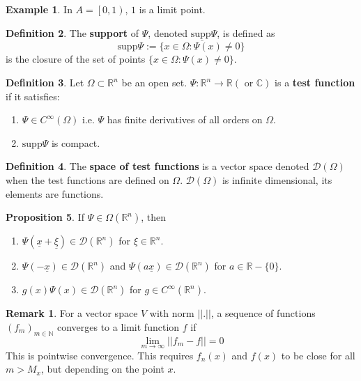 \documentclass[12pt,a4paper]{article}
\theoremstyle{definition}
\newtheorem{definition}{Definition}[subsection]
\newtheorem{proposition}[definition]{Proposition}
\newtheorem{example}[definition]{Example}
\newtheorem*{remark}{Remark}
\begin{document}
\begin{example}
	In $A = \left[0, 1 \right)$, $1$ is a limit point.
\end{example}

\begin{definition}
	The \textbf{support} of $\Psi$, denoted $\text{supp} \Psi$, is defined as
	\[
		\text{supp} \Psi := \overline{\{ x \in \Omega: \Psi(x) \ne 0 \}}
	\]
	is the closure of the set of points $\{ x \in \Omega: \Psi(x) \ne 0 \}$.
\end{definition}

\begin{definition}
	Let $\Omega \subset \mathbb{R}^n$ be an open set. $\Psi: \mathbb{R}^n \rightarrow \mathbb{R} (\text{ or } \mathbb{C})$ is a \textbf{test function} if it satisfies:
	\begin{enumerate}
		\item $\Psi \in C^{\infty} (\Omega)$ i.e. $\Psi$ has finite derivatives of all orders on $\Omega$.
		\item $\text{supp} \Psi$ is compact.
	\end{enumerate}
\end{definition}

\begin{definition}
	The \textbf{space of test functions} is a vector space denoted $\mathcal{D}(\Omega)$ when the test functions are defined on $\Omega$. $\mathcal{D}(\Omega)$ is infinite dimensional, its elements are functions.
\end{definition}

\begin{proposition}
	If $\Psi \in \Omega(\mathbb{R}^n)$, then
	\begin{enumerate}
		\item $\Psi(\underline{x} + \underline{\xi}) \in \mathcal{D} (\mathbb{R}^n)$ for $\xi \in \mathbb{R}^n$.
		\item $\Psi(-\underline{x}) \in \mathcal{D}(\mathbb{R}^n)$ and $\Psi(a \underline{x}) \in \mathcal{D}(\mathbb{R}^n)$ for $a \in \mathbb{R} - \{ 0 \}$.
		\item $g(x) \Psi(x) \in \mathcal{D}(\mathbb{R}^n)$ for $g \in C^{\infty} (\mathbb{R}^n)$.
	\end{enumerate}
\end{proposition}

\begin{remark}
	For a vector space $V$ with norm $|| . ||$, a sequence of functions ${(f_m)}_{m \in \mathbb{N}}$ converges to a limit function $f$ if
	\[
		\lim_{m \rightarrow \infty} || f_m - f || = 0
	\]
	This is pointwise convergence. This requires $f_n(x)$ and $f(x)$ to be close for all $m > M_x$, but depending on the point $x$.
\end{remark}
\end{document}
